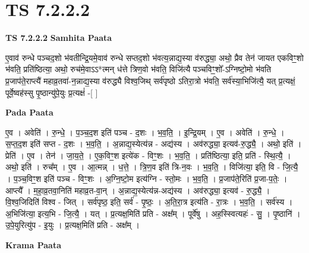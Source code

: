 \documentclass[17pt]{extarticle}
\begin{document}
\section{ TS 7.2.2.2 }

\textbf{TS 7.2.2.2 } \newline
\textbf{Samhita Paata} \newline

ए॒वाव॑ रुन्धे पञ्चद॒शो भ॑वतीन्द्रि॒यमे॒वाव॑ रुन्धे सप्तद॒शो भ॑वत्य॒न्नाद्य॒स्या व॑रुद्ध्या॒ अथो॒ प्रैव तेन॑ जायत एकविꣳ॒॒शो भ॑वति॒ प्रति॑ष्ठित्या॒ अथो॒ रुच॑मे॒वाऽऽ*त्मन् ध॑त्ते त्रिण॒वो भ॑वति॒ विजि॑त्यै पञ्चविꣳ॒॒शो᳚-ऽग्निष्टो॒मो भ॑वति प्र॒जाप॑ते॒राप्त्यै॑ महाव्र॒तवा॑-न॒न्नाद्य॒स्या व॑रुद्ध्यै विश्व॒जिथ् सर्व॑पृष्ठो ऽतिरा॒त्रो भ॑वति॒ सर्व॑स्या॒भिजि॑त्यै॒ यत् प्र॒त्यक्षं॒ पूर्वे॒ष्वह॑स्सु पृ॒ष्ठान्यु॑पे॒युः प्र॒त्यक्षं॑ -[  ] \newline

\textbf{Pada Paata} \newline

ए॒व । अवेति॑ । रु॒न्धे॒ । प॒ञ्च॒द॒श इति॑ पञ्च - द॒शः । भ॒व॒ति॒ । इ॒न्द्रि॒यम् । ए॒व । अवेति॑ । रु॒न्धे॒ । स॒प्त॒द॒श इति॑ सप्त - द॒शः । भ॒व॒ति॒ । अ॒न्नाद्य॒स्येत्य॑न्न - अद्य॑स्य । अव॑रुद्ध्या॒ इत्यव॑-रु॒द्ध्यै॒ । अथो॒ इति॑ । प्रेति॑ । ए॒व । तेन॑ । जा॒य॒ते॒ । ए॒क॒विꣳ॒॒श इत्ये॑क - विꣳ॒॒शः । भ॒व॒ति॒ । प्रति॑ष्ठित्या॒ इति॒ प्रति॑ - स्थि॒त्यै॒ । अथो॒ इति॑ । रुच᳚म् । ए॒व । आ॒त्मन्न् । ध॒त्ते॒ । त्रि॒ण॒व इति॑ त्रि-न॒वः । भ॒व॒ति॒ । विजि॑त्या॒ इति॒ वि - जि॒त्यै॒ । प॒ञ्च॒विꣳ॒॒श इति॑ पञ्च - विꣳ॒॒शः । अ॒ग्नि॒ष्टो॒म इत्य॑ग्नि - स्तो॒मः । भ॒व॒ति॒ । प्र॒जाप॑ते॒रिति॑ प्र॒जा-प॒तेः॒ । आप्त्यै᳚ । म॒हा॒व्र॒तवा॒निति॑ महाव्र॒त-वा॒न् । अ॒न्नाद्य॒स्येत्य॑न्न-अद्य॑स्य । अव॑रुद्ध्या॒ इत्यव॑ - रु॒द्ध्यै॒ । वि॒श्व॒जिदिति॑ विश्व - जित् । सर्व॑पृष्ठ॒ इति॒ सर्व॑ - पृ॒ष्ठः॒ । अ॒ति॒रा॒त्र इत्य॑ति - रा॒त्रः । भ॒व॒ति॒ । सर्व॑स्य । अ॒भिजि॑त्या॒ इत्य॒भि - जि॒त्यै॒ । यत् । प्र॒त्यक्ष॒मिति॑ प्रति - अक्ष᳚म् । पूर्वे॑षु । अह॒स्स्वित्यहः॑ - सु॒ । पृ॒ष्ठानि॑ । उ॒पे॒युरित्यु॑प - इ॒युः । प्र॒त्यक्ष॒मिति॑ प्रति - अक्ष᳚म् ।  \newline


\textbf{Krama Paata} \newline
\end{document}
